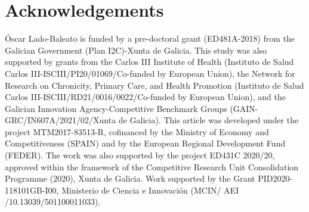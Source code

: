 \section{Acknowledgements}

Óscar Lado-Baleato is funded by a pre-doctoral grant (ED481A-2018) from the Galician Government (Plan I2C)-Xunta de Galicia. This study was also supported by grants from the Carlos III Institute of Health (Instituto de Salud Carlos III-ISCIII/PI20/01069/Co-funded by European Union), the Network for Research on Chronicity, Primary Care, and Health Promotion (Instituto de Salud Carlos III-ISCIII/RD21/0016/0022/Co-funded by European Union), and the Galician Innovation Agency-Competitive Benchmark Groups (GAIN-GRC/IN607A/2021/02/Xunta de Galicia). This article was developed under the project MTM2017-83513-R, cofinanced by the Ministry of Economy and Competitiveness (SPAIN) and by the European Regional Development Fund (FEDER). The work was also supported by the project ED431C 2020/20, approved within the framework of the Competitive Research Unit Consolidation Programme (2020), Xunta de Galicia. Work supported by the Grant PID2020-118101GB-I00, Ministerio de Ciencia e Innovación (MCIN/ AEI /10.13039/501100011033).  




\address{Óscar Lado-Baleato\\
  Department of Statistics, Mathematical Analysis, and Optimization, Universidade de Santiago de Compostela, Galicia, Spain.\\
  Medicine Colleague, Rúa San Francisco, Santiago de Compostela.\\
  Galicia, Spain\\
  (https://orcid.org/0000-0001-9592-4879)\\
  }

\address{Javier Roca-Pardiñas\\
	Galician Center for Mathematical Research and Technology (CITMAga) \&
  Statistical Inference, Decision and Operations Research, Universidade de  Vigo.\\
  Rúa do Conde de Torrecedeira, 86, 36310 Vigo, Pontevedra.\\
   Galicia, Spain\\
  }

\address{Carmen Cadarso-Suárez\\
	Galician Center for Mathematical Research and Technology (CITMAga) \&
 Department of Statistics, Mathematical Analysis, and Optimization, Universidade de Santiago de Compostela, Galicia, Spain.\\
Medicine Colleague, Rúa San Francisco, Santiago de Compostela.\\
 Galicia, Spain\\
  }

\address{Francisco Gude\\
	Clinical Epidemiology Unit, Complexo Hospitalario de Santiago de Compostela.\\
	Rúa da Choupana, s/n, 15706 Santiago de Compostela, A Coruña\\
	 Galicia, Spain\\
	}

